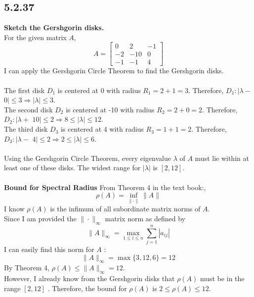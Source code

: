 \documentclass[manuscript,screen,review]{acmart}
\begin{document}
\subsection*{5.2.37}
\textbf{Sketch the Gershgorin disks.}
\\
For the given matrix $A$,
$$
A=\left[\begin{array}{rrr}
0 & 2 & -1 \\
-2 & -10 & 0 \\
-1 & -1 & 4
\end{array}\right]
$$
I can apply the Gershgorin Circle Theorem to find the Gershgorin disks.
\\
\\
The first disk \textbf{$D_1$} is centered at 0 with radius $R_1=2+1=3$. Therefore, $D_1: \mid \lambda-$ $0|\leq 3 \Rightarrow| \lambda \mid \leq 3$.
\\
The second disk \textbf{$D_2$} is centered at -10 with radius $R_2=2+0=2$. Therefore, $D_2: \mid \lambda+$ $10|\leq 2 \Rightarrow 8 \leq| \lambda \mid \leq 12$.
\\
The third disk \textbf{$D_3$} is centered at 4 with radius $R_3=1+1=2$. Therefore, $D_3: \mid \lambda-$ $4|\leq 2 \Rightarrow 2 \leq| \lambda \mid \leq 6$.
\\
\\
Using the Gershgorin Circle Theorem, every eigenvalue $\lambda$ of $A$ must lie within at least one of these disks. The widest range for $|\lambda|$ is $[2,12]$.
\\
\\
\textbf{Bound for Spectral Radius}
From Theorem 4 in the text book:,
$$
\rho(A)=\inf _{\|\cdot\|}\|A\|
$$
I know $\rho(A)$ is the infimum of all subordinate matrix norms of $A$.
\\
Since I am provided the $\|\cdot\|_{\infty}$ matrix norm as defined by
$$
\|A\|_{\infty}=\max _{1 \leq i \leq n} \sum_{j=1}^n\left|a_{i j}\right|
$$
I can easily find this norm for $A$ :
$$
\|A\|_{\infty}=\max \{3,12,6\}=12
$$
By Theorem 4, $\rho(A) \leq\|A\|_{\infty}=12$.
\\
However, I already know from the Gershgorin disks that $\rho(A)$ must be in the range $[2,12]$ . Therefore, the bound for $\rho(A)$ is $2 \leq \rho(A) \leq 12$.
\end{document}
